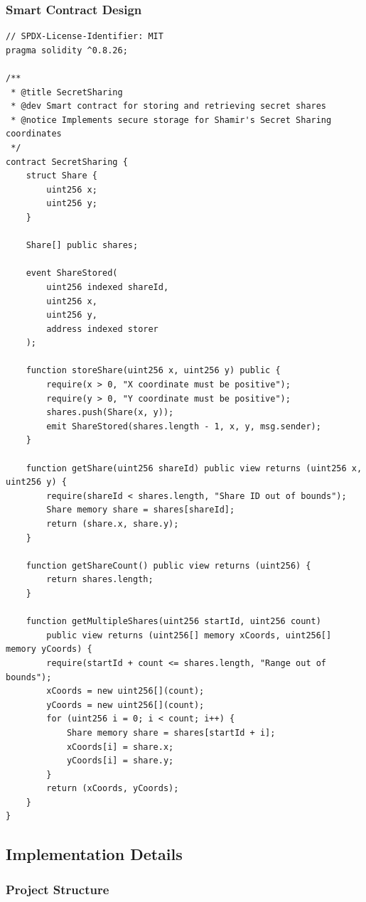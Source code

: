 \documentclass[12pt,a4paper]{article}
\begin{document}
\subsubsection{Smart Contract Design}

\begin{lstlisting}[language=Solidity, caption=Smart Contract Implementation, label=lst:smart_contract]
// SPDX-License-Identifier: MIT
pragma solidity ^0.8.26;

/**
 * @title SecretSharing
 * @dev Smart contract for storing and retrieving secret shares
 * @notice Implements secure storage for Shamir's Secret Sharing coordinates
 */
contract SecretSharing {
    struct Share {
        uint256 x;
        uint256 y;
    }
    
    Share[] public shares;
    
    event ShareStored(
        uint256 indexed shareId, 
        uint256 x, 
        uint256 y,
        address indexed storer
    );
    
    function storeShare(uint256 x, uint256 y) public {
        require(x > 0, "X coordinate must be positive");
        require(y > 0, "Y coordinate must be positive");
        shares.push(Share(x, y));
        emit ShareStored(shares.length - 1, x, y, msg.sender);
    }
    
    function getShare(uint256 shareId) public view returns (uint256 x, uint256 y) {
        require(shareId < shares.length, "Share ID out of bounds");
        Share memory share = shares[shareId];
        return (share.x, share.y);
    }
    
    function getShareCount() public view returns (uint256) {
        return shares.length;
    }
    
    function getMultipleShares(uint256 startId, uint256 count) 
        public view returns (uint256[] memory xCoords, uint256[] memory yCoords) {
        require(startId + count <= shares.length, "Range out of bounds");
        xCoords = new uint256[](count);
        yCoords = new uint256[](count);
        for (uint256 i = 0; i < count; i++) {
            Share memory share = shares[startId + i];
            xCoords[i] = share.x;
            yCoords[i] = share.y;
        }
        return (xCoords, yCoords);
    }
}
\end{lstlisting}
\subsection{Implementation Details}

\subsubsection{Project Structure}
\end{document}
